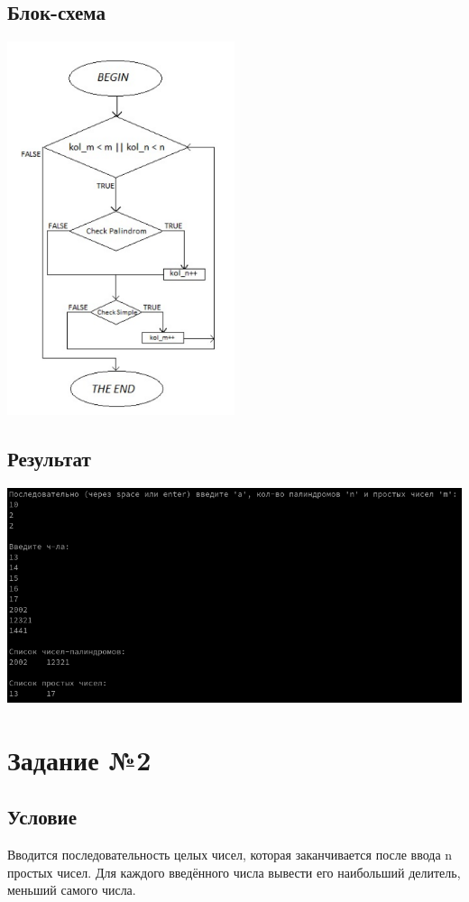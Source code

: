 \documentclass[a4paper]{article}
\begin{document}
\subsection{Блок-схема}
\includegraphics[width=0.5\textwidth]{block1.png}
\subsection{Результат}
\includegraphics[width=1\textwidth]{1.png}
\newpage
\section{Задание №2} 
\subsection{Условие}
Вводится последовательность целых чисел, которая заканчивается после ввода n простых чисел. Для каждого введённого числа вывести его наибольший делитель, меньший самого числа.
\end{document}
